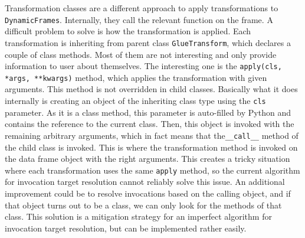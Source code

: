 Transformation classes are a different approach to apply transformations to \texttt{DynamicFrames}. Internally, they call the relevant function on the frame. A difficult problem to solve is how the transformation is applied. Each transformation is inheriting from parent class \texttt{GlueTransform}, which declares a couple of class methods. Most of them are not interesting and only provide information to user about themselves. The interesting one is the \texttt{apply(cls, *args, **kwargs)} method, which applies the transformation with given arguments. This method is not overridden in child classes. Basically what it does internally is creating an object of the inheriting class type using the \texttt{cls} parameter. As it is a class method, this parameter is auto-filled by Python and contains the reference to the current class. Then, this object is invoked with the remaining arbitrary arguments, which in fact means that the\texttt{\_\_call\_\_} method of the child class is invoked. This is where the transformation method is invoked on the data frame object with the right arguments. This creates a tricky situation where each transformation uses the same \texttt{apply} method, so the current algorithm for invocation target resolution cannot reliably solve this issue. An additional improvement could be to resolve invocations based on the calling object, and if that object turns out to be a class, we can only look for the methods of that class. This solution is a mitigation strategy for an imperfect algorithm for invocation target resolution, but can be implemented rather easily.

